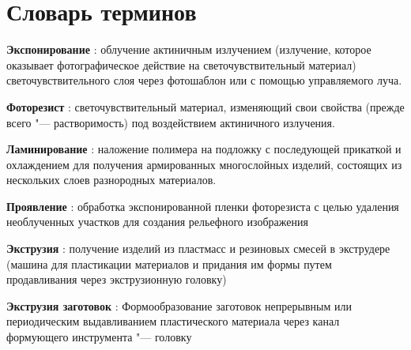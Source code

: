 \chapter*{Словарь терминов}             %



\textbf{Экспонирование} : облучение актиничным излучением (излучение, которое оказывает фотографическое действие на светочувствительный материал) светочувствительного слоя через фотошаблон или с помощью управляемого луча.

\textbf{Фоторезист} : светочувствительный материал, изменяющий свои свойства (прежде всего "--- растворимость) под воздействием актиничного излучения. 

\textbf{Ламинирование} : наложение полимера на подложку с последующей прикаткой и охлаждением для получения армированных многослойных изделий, состоящих из нескольких слоев разнородных материалов.

\textbf{Проявление} : обработка экспонированной пленки фоторезиста с целью удаления необлученных участков для создания рельефного изображения

\textbf{Экструзия} : получение изделий из пластмасс и резиновых смесей в экструдере (машина для пластикации материалов и придания им формы путем продавливания через экструзионную головку)

\textbf{Экструзия заготовок} : Формообразование заготовок непрерывным или периодическим выдавливанием пластического материала через канал формующего инструмента "--- головку 
